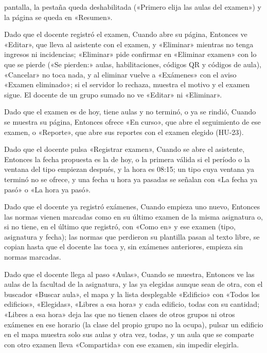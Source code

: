 {      pantalla, la pestaña queda deshabilitada («Primero elija las aulas del examen») y
      la página se queda en «Resumen».
\item Dado que el docente registró el examen, Cuando abre su página, Entonces ve
      «Editar», que lleva al asistente con el examen, y «Eliminar» mientras no tenga
      ingresos ni incidencias; «Eliminar» pide confirmar en «Eliminar examen» con lo que
      se pierde («Se pierden:» aulas, habilitaciones, códigos QR y códigos de aula),
      «Cancelar» no toca nada, y al eliminar vuelve a «Exámenes» con el aviso «Examen
      eliminado»; si el servidor lo rechaza, muestra el motivo y el examen sigue. El
      docente de un grupo sumado no ve «Editar» ni «Eliminar».
\item Dado que el examen es de hoy, tiene aulas y no terminó, o ya se rindió, Cuando se
      muestra su página, Entonces ofrece «En curso», que abre el seguimiento de ese
      examen, o «Reporte», que abre sus reportes con el examen elegido (HU-23).
\item Dado que el docente pulsa «Registrar examen», Cuando se abre el asistente,
      Entonces la fecha propuesta es la de hoy, o la primera válida si el período o la
      ventana del tipo empiezan después, y la hora es 08:15; un tipo cuya ventana ya
      terminó no se ofrece, y una fecha u hora ya pasadas se señalan con «La fecha ya
      pasó» o «La hora ya pasó».
\item Dado que el docente ya registró exámenes, Cuando empieza uno nuevo, Entonces las
      normas vienen marcadas como en su último examen de la misma asignatura o, si no
      tiene, en el último que registró, con «Como en» y ese examen (tipo, asignatura y
      fecha); las normas que perdieron su plantilla pasan al texto libre, se copian
      hasta que el docente las toca y, sin exámenes anteriores, empieza sin normas
      marcadas.
\item Dado que el docente llega al paso «Aulas», Cuando se muestra, Entonces ve las
      aulas de la facultad de la asignatura, y las ya elegidas aunque sean de otra, con
      el buscador «Buscar aula», el mapa y la lista desplegable «Edificio» con «Todos
      los edificios», «Elegidas», «Libres a esa hora» y cada edificio, todas con su
      cantidad; «Libres a esa hora» deja las que no tienen clases de otros grupos ni
      otros exámenes en ese horario (la clase del propio grupo no la ocupa), pulsar un
      edificio en el mapa muestra solo sus aulas y otra vez, todas, y un aula que se
      comparte con otro examen lleva «Compartida» con ese examen, sin impedir elegirla.
}

